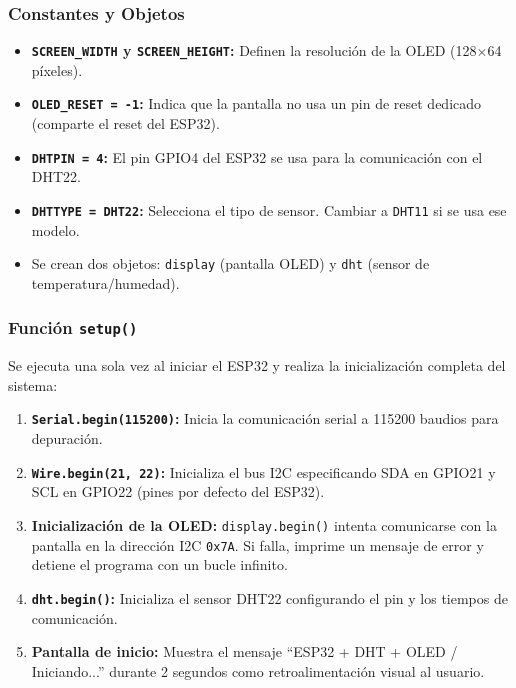 \documentclass[12pt,a4paper]{article}
\begin{document}
\subsubsection*{Constantes y Objetos}
\begin{itemize}
    \item \textbf{\texttt{SCREEN\_WIDTH} y \texttt{SCREEN\_HEIGHT}:} Definen la resolución de la OLED (128$\times$64 píxeles).
    \item \textbf{\texttt{OLED\_RESET = -1}:} Indica que la pantalla no usa un pin de reset dedicado (comparte el reset del ESP32).
    \item \textbf{\texttt{DHTPIN = 4}:} El pin GPIO4 del ESP32 se usa para la comunicación con el DHT22.
    \item \textbf{\texttt{DHTTYPE = DHT22}:} Selecciona el tipo de sensor. Cambiar a \texttt{DHT11} si se usa ese modelo.
    \item Se crean dos objetos: \texttt{display} (pantalla OLED) y \texttt{dht} (sensor de temperatura/humedad).
\end{itemize}

\subsubsection*{Función \texttt{setup()}}
Se ejecuta una sola vez al iniciar el ESP32 y realiza la inicialización completa del sistema:

\begin{enumerate}
    \item \textbf{\texttt{Serial.begin(115200)}:} Inicia la comunicación serial a 115200 baudios para depuración.
    \item \textbf{\texttt{Wire.begin(21, 22)}:} Inicializa el bus I2C especificando SDA en GPIO21 y SCL en GPIO22 (pines por defecto del ESP32).
    \item \textbf{Inicialización de la OLED:} \texttt{display.begin()} intenta comunicarse con la pantalla en la dirección I2C \texttt{0x7A}. Si falla, imprime un mensaje de error y detiene el programa con un bucle infinito.
    \item \textbf{\texttt{dht.begin()}:} Inicializa el sensor DHT22 configurando el pin y los tiempos de comunicación.
    \item \textbf{Pantalla de inicio:} Muestra el mensaje ``ESP32 + DHT + OLED / Iniciando...'' durante 2 segundos como retroalimentación visual al usuario.
\end{enumerate}
\end{document}
